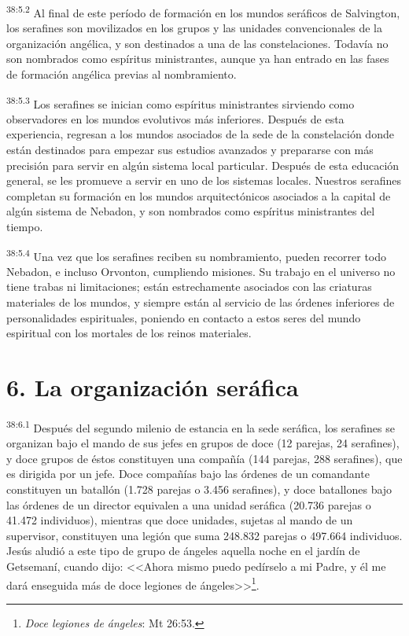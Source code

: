 \par
\textsuperscript{38:5.2} Al final de este período de formación en los mundos seráficos de Salvington, los serafines son movilizados en los grupos y las unidades convencionales de la organización angélica, y son destinados a una de las constelaciones. Todavía no son nombrados como espíritus ministrantes, aunque ya han entrado en las fases de formación angélica previas al nombramiento.

\par
\textsuperscript{38:5.3} Los serafines se inician como espíritus ministrantes sirviendo como observadores en los mundos evolutivos más inferiores. Después de esta experiencia, regresan a los mundos asociados de la sede de la constelación donde están destinados para empezar sus estudios avanzados y prepararse con más precisión para servir en algún sistema local particular. Después de esta educación general, se les promueve a servir en uno de los sistemas locales. Nuestros serafines completan su formación en los mundos arquitectónicos asociados a la capital de algún sistema de Nebadon, y son nombrados como espíritus ministrantes del tiempo.

\par
\textsuperscript{38:5.4} Una vez que los serafines reciben su nombramiento, pueden recorrer todo Nebadon, e incluso Orvonton, cumpliendo misiones. Su trabajo en el universo no tiene trabas ni limitaciones; están estrechamente asociados con las criaturas materiales de los mundos, y siempre están al servicio de las órdenes inferiores de personalidades espirituales, poniendo en contacto a estos seres del mundo espiritual con los mortales de los reinos materiales.

\section*{6. La organización seráfica}
\par
\textsuperscript{38:6.1} Después del segundo milenio de estancia en la sede seráfica, los serafines se organizan bajo el mando de sus jefes en grupos de doce (12 parejas, 24 serafines), y doce grupos de éstos constituyen una compañía (144 parejas, 288 serafines), que es dirigida por un jefe. Doce compañías bajo las órdenes de un comandante constituyen un batallón (1.728 parejas o 3.456 serafines), y doce batallones bajo las órdenes de un director equivalen a una unidad seráfica (20.736 parejas o 41.472 individuos), mientras que doce unidades, sujetas al mando de un supervisor, constituyen una legión que suma 248.832 parejas o 497.664 individuos. Jesús aludió a este tipo de grupo de ángeles aquella noche en el jardín de Getsemaní, cuando dijo: <<Ahora mismo puedo pedírselo a mi Padre, y él me dará enseguida más de doce legiones de ángeles>>\footnote{\textit{Doce legiones de ángeles}: Mt 26:53.}.

